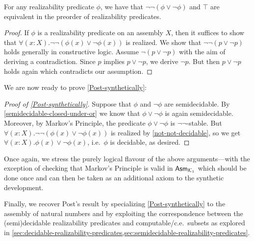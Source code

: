 \begin{lemma}\label{not-not-decidable}
  For any realizability predicate \(\phi\), we have that
  \(\lnot\lnot(\phi\lor\lnot\phi)\) and \(\top\) are equivalent in the preorder
  of realizability predicates.
\end{lemma}
\begin{proof}
  If \(\phi\) is a realizability predicate on an assembly \(X\), then it
  suffices to show that \(\forall(x : X).\lnot\lnot(\phi(x)\lor\lnot\phi(x))\)
  is realized.
  We show that \(\lnot\lnot(p \lor \lnot p)\) holds generally in constructive
  logic.
  Assume \(\lnot(p \lor \lnot p)\) with the aim of deriving a contradiction.
  Since \(p\) implies \(p \lor \lnot p\), we derive \(\lnot p\).
  But then \(p \lor \lnot p\) holds again which contradicts our assumption.
\end{proof}

We are now ready to prove \cref{Post-synthetically}:
\begin{proof}[Proof of \cref{Post-synthetically}]
  Suppose that \(\phi\) and \(\lnot\phi\) are semidecidable.
  By \cref{semidecidable-closed-under-or} we know that \(\phi\lor\lnot\phi\) is
  again semidecidable.
  Moreover, by Markov's Principle, the predicate \(\phi\lor\lnot\phi\) is
  \(\lnot\lnot\)-stable.
  But \(\forall(x:X).\lnot\lnot(\phi(x)\lor\lnot\phi(x))\) is realized by
  \cref{not-not-decidable}, so we get \(\forall(x:X).\phi(x)\lor\lnot\phi(x)\),
  i.e.\ \(\phi\) is decidable, as desired.
\end{proof}

Once again, we stress the purely logical flavour of the above arguments---with
the exception of checking that Markov's Principle is valid in \(\mathsf{Asm}_{\mathcal{K}_1}\)
which should be done once and can then be taken as an additional axiom to the
synthetic development.

Finally, we recover Post's result by specializing \cref{Post-synthetically} to
the assembly of natural numbers and by exploiting the correspondence between the
(semi)decidable realizability predicates and computable/c.e.\ subsets as
explored in
\cref{sec:decidable-realizability-predicates,sec:semidecidable-realizability-predicates}.



